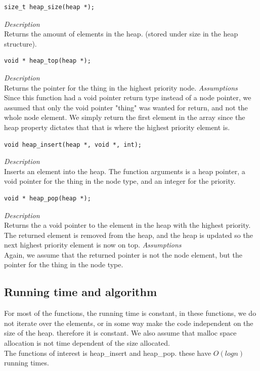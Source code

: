 \documentclass[11pt]{article}
\begin{document}
\begin{lstlisting}[style=customc]
size_t heap_size(heap *);
\end{lstlisting}

\textit{Description}\\
Returns the amount of elements in the heap. (stored under size in the heap
structure). \\

\begin{lstlisting}[style=customc]
void * heap_top(heap *);
\end{lstlisting}

\textit{Description} \\
Returns the pointer for the thing in the highest priority node.
\textit{Assumptions}\\
Since this function had a void pointer return type instead of a node pointer, we
assumed that only the void pointer "thing" was wanted for return, and not the
whole node element.  We simply return the first element in the array since the
heap property dictates that that is where the highest priority element is. \\

\begin{lstlisting}[style=customc]
void heap_insert(heap *, void *, int);
\end{lstlisting}
\textit{Description}\\
Inserts an element into the heap.  The function arguments is a heap pointer, a
void pointer for the thing in the node type, and an integer for the priority. \\

\begin{lstlisting}[style=customc]
void * heap_pop(heap *);
\end{lstlisting}
\textit{Description}\\
Returns the a void pointer to the element in the heap with the highest priority.
The returned element is removed from the heap, and the heap is updated so the
next highest priority element is now on top.
\textit{Assumptions}\\
Again, we assume that the returned pointer is not the node element, but the
pointer for the thing in the node type. \\

\subsection*{Running time and algorithm}
For most of the functions, the running time is constant, in these functions, we
do not iterate over the elements, or in some way make the code independent on
the size of the heap. therefore it is constant. We also assume that malloc space
allocation is not time dependent of the size allocated. \\
The functions of interest is heap\_insert and heap\_pop. these have $O(log n)$
running times.
\end{document}
